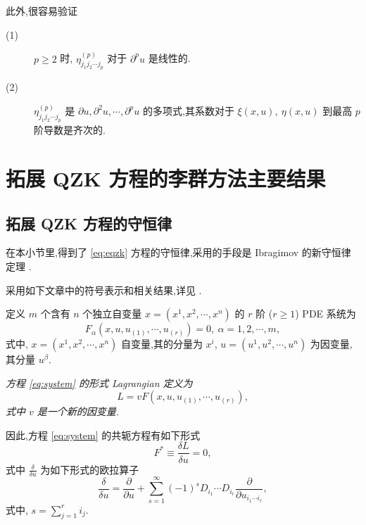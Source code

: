 此外,很容易验证
\begin{description}
	\item[(1)] $p\geq 2$ 时, $\eta_{j_1j_2\cdots j_p}^{(p)}$ 对于 $\partial^pu$ 是线性的.
	\item[(2)] $\eta_{j_1j_2\cdots j_p}^{(p)}$ 是 $\partial u,\partial^2u,\cdots,\partial^pu$ 的多项式,其系数对于 $\xi(x,u),~\eta(x,u)$ 到最高 $p$ 阶导数是齐次的.
\end{description}

\section{拓展 QZK 方程的李群方法主要结果}

\subsection{拓展 QZK 方程的守恒律}\label{sec:05con}
在本小节里,得到了 \eqref{eq:eqzk} 方程的守恒律,采用的手段是 Ibragimov 的新守恒律定理 \cite{wazwaz2012soli,yan2009per}.

采用如下文章中的符号表示和相关结果,详见 \cite{wazwaz2012soli,yan2009per,yasar2010con,zakharov1974on}.

定义 $m$ 个含有 $n$ 个独立自变量 $x=(x^1,x^2,\cdots,x^n)$ 的 $r$ 阶  ($r\geq1$) PDE 系统为
\begin{equation}\label{eq:system}
F_\alpha(x,u,u_{(1)},\cdots,u_{(r)})=0,~ \alpha=1,2,\cdots,m,
\end{equation}
式中, $x=(x^1,x^2,\cdots,x^n)$ 自变量,其的分量为 $x^i$, $u=(u^1,u^2,\cdots,u^n)$ 为因变量,其分量 $u^\beta$.

\begin{definition}[形式 Lagrangian]
	\emph{方程 \eqref{eq:system} 的形式 Lagrangian 定义为
	\begin{equation*}
		L=vF(x,u,u_{(1)},\cdots,u_{(r)}),
	\end{equation*}
	式中 $v$ 是一个新的因变量.}
\end{definition}

因此,方程 \eqref{eq:system} 的共轭方程有如下形式
\begin{equation}\label{eq:adjoint}
	F^*\equiv \frac{\delta L}{\delta u} = 0,
\end{equation}
式中 $\displaystyle \frac{\delta}{\delta u}$ 为如下形式的欧拉算子
\begin{equation*}
	\frac{\delta}{\delta u} = \frac{\partial}{\partial u}+\sum_{s=1}^{\infty}(-1)^{s}D_{i_1}\cdots D_{i_r}\frac{\partial}{\partial u_{i_1\cdots i_r}},
\end{equation*}
式中, $s=\sum_{j=1}^{r}i_j$.

